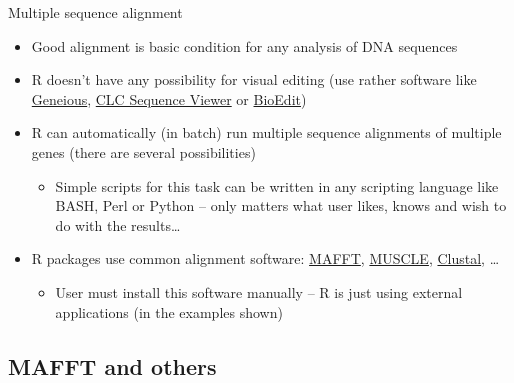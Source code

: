 \documentclass[compress, ucs, xelatex, 11pt, xcolor=svgnames,
  hyperref={
    bookmarks=true,
    unicode=true,
    colorlinks=true,
    pdftitle={Molecular data in R},
    plainpages=false,
    pdfauthor={Vojtech Zeisek},
    pdfsubject={Course about phylogeny and evolution in R},
    pdfcreator={XeLaTeX},
    pdfkeywords={R, evolution, phylogeny, molecular data},
    linkcolor=Tomato,
    anchorcolor=SaddleBrown,
    citecolor=Goldenrod,
    filecolor=DarkMagenta,
    menucolor=Sienna,
    urlcolor=DarkTurquoise,
    pdftex},
  url={hyphens, lowtilde} %
  ]{beamer}
\begin{document}
\begin{frame}{Multiple sequence alignment}
  \begin{itemize}
    \item Good alignment is basic condition for any analysis of DNA sequences
    \item R doesn't have any possibility for visual editing (use rather software like \href{http://www.geneious.com/}{Geneious}, \href{http://www.clcbio.com/products/clc-sequence-viewer/}{CLC Sequence Viewer} or \href{http://www.mbio.ncsu.edu/bioedit/bioedit.html}{BioEdit})
    \item R can automatically (in batch) run multiple sequence alignments of multiple genes (there are several possibilities)
    \begin{itemize}
      \item Simple scripts for this task can be written in any scripting language like BASH, Perl or Python -- only matters what user likes, knows and wish to do with the results\ldots
    \end{itemize}
    \item R packages use common alignment software: \href{http://mafft.cbrc.jp/alignment/software/}{MAFFT}, \href{http://www.drive5.com/muscle/}{MUSCLE}, \href{http://www.clustal.org/}{Clustal}, \ldots
    \begin{itemize}
      \item User must install this software manually -- R is just using external applications (in the examples shown)
    \end{itemize}
  \end{itemize}
\end{frame}

\subsection{MAFFT and others}
\end{document}

